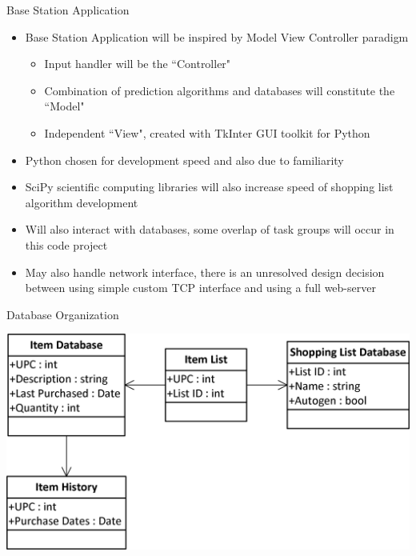 \documentclass[t]{beamer}
\begin{document}
\begin{frame}{Base Station Application}
\begin{itemize}
\item Base Station Application will be inspired by Model View Controller paradigm
\begin{itemize}
\item Input handler will be the ``Controller"
\item Combination of prediction algorithms and databases will constitute the ``Model"
\item Independent ``View", created with TkInter GUI toolkit for Python
\end{itemize}
\item Python chosen for development speed and also due to familiarity
\item SciPy scientific computing libraries will also increase speed of shopping list algorithm development
\item Will also interact with databases, some overlap of task groups will occur in this code project
\item May also handle network interface, there is an unresolved design decision between using simple custom TCP interface and using a full web-server
\end{itemize}
\end{frame}

\begin{frame}{Database Organization}
\begin{center}
\includegraphics[scale=1.0]{../Graphics/Databases}
\end{center}
\end{frame}
\end{document}
